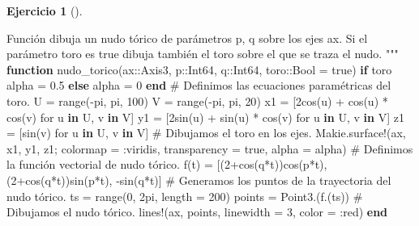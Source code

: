 \documentclass[
  a4paper,
]{scrreport}
\newenvironment{Shaded}{\begin{snugshade}}{\end{snugshade}}
\newcommand{\CommentTok}[1]{\textcolor[rgb]{0.37,0.37,0.37}{#1}}
\newcommand{\ConstantTok}[1]{\textcolor[rgb]{0.56,0.35,0.01}{#1}}
\newcommand{\ControlFlowTok}[1]{\textcolor[rgb]{0.00,0.23,0.31}{\textbf{#1}}}
\newcommand{\DataTypeTok}[1]{\textcolor[rgb]{0.68,0.00,0.00}{#1}}
\newcommand{\FloatTok}[1]{\textcolor[rgb]{0.68,0.00,0.00}{#1}}
\newcommand{\FunctionTok}[1]{\textcolor[rgb]{0.28,0.35,0.67}{#1}}
\newcommand{\KeywordTok}[1]{\textcolor[rgb]{0.00,0.23,0.31}{\textbf{#1}}}
\newcommand{\NormalTok}[1]{\textcolor[rgb]{0.00,0.23,0.31}{#1}}
\newcommand{\OperatorTok}[1]{\textcolor[rgb]{0.37,0.37,0.37}{#1}}
\newcommand{\StringTok}[1]{\textcolor[rgb]{0.13,0.47,0.30}{#1}}
\theoremstyle{definition}
\newtheorem{exercise}{Ejercicio}[chapter]
\theoremstyle{remark}
\begin{document}
\begin{exercise}[]
\begin{enumerate}
\begin{tcolorbox}
\begin{Shaded}
\begin{Highlighting}[]
\StringTok{Función dibuja un nudo tórico de parámetros p, q sobre los ejes ax. Si el parámetro toro es true dibuja también el toro sobre el que se traza el nudo.}
\StringTok{"""}
\KeywordTok{function} \FunctionTok{nudo\_torico}\NormalTok{(ax}\OperatorTok{::}\DataTypeTok{Axis3}\NormalTok{, p}\OperatorTok{::}\DataTypeTok{Int64}\NormalTok{, q}\OperatorTok{::}\DataTypeTok{Int64}\NormalTok{, toro}\OperatorTok{::}\DataTypeTok{Bool }\OperatorTok{=} \ConstantTok{true}\NormalTok{)}
    \ControlFlowTok{if}\NormalTok{ toro }
\NormalTok{        alpha }\OperatorTok{=} \FloatTok{0.5}
    \ControlFlowTok{else}
\NormalTok{        alpha }\OperatorTok{=} \FloatTok{0}
    \ControlFlowTok{end}
    \CommentTok{\# Definimos las ecuaciones paramétricas del toro.}
\NormalTok{    U }\OperatorTok{=} \FunctionTok{range}\NormalTok{(}\OperatorTok{{-}}\ConstantTok{pi}\NormalTok{, }\ConstantTok{pi}\NormalTok{, }\FloatTok{100}\NormalTok{)}
\NormalTok{    V }\OperatorTok{=} \FunctionTok{range}\NormalTok{(}\OperatorTok{{-}}\ConstantTok{pi}\NormalTok{, }\ConstantTok{pi}\NormalTok{, }\FloatTok{20}\NormalTok{)}
\NormalTok{    x1 }\OperatorTok{=}\NormalTok{ [}\FloatTok{2}\FunctionTok{cos}\NormalTok{(u) }\OperatorTok{+} \FunctionTok{cos}\NormalTok{(u) }\OperatorTok{*} \FunctionTok{cos}\NormalTok{(v) for u }\KeywordTok{in}\NormalTok{ U, v }\KeywordTok{in}\NormalTok{ V]}
\NormalTok{    y1 }\OperatorTok{=}\NormalTok{ [}\FloatTok{2}\FunctionTok{sin}\NormalTok{(u) }\OperatorTok{+} \FunctionTok{sin}\NormalTok{(u) }\OperatorTok{*} \FunctionTok{cos}\NormalTok{(v) for u }\KeywordTok{in}\NormalTok{ U, v }\KeywordTok{in}\NormalTok{ V]}
\NormalTok{    z1 }\OperatorTok{=}\NormalTok{ [}\FunctionTok{sin}\NormalTok{(v) for u }\KeywordTok{in}\NormalTok{ U, v }\KeywordTok{in}\NormalTok{ V]}
    \CommentTok{\# Dibujamos el toro en los ejes.}
\NormalTok{    Makie.}\FunctionTok{surface!}\NormalTok{(ax, x1, y1, z1; colormap }\OperatorTok{=} \OperatorTok{:}\NormalTok{viridis, transparency }\OperatorTok{=} \ConstantTok{true}\NormalTok{, alpha }\OperatorTok{=}\NormalTok{ alpha)}
    \CommentTok{\# Definimos la función vectorial de nudo tórico.}
    \FunctionTok{f}\NormalTok{(t) }\OperatorTok{=}\NormalTok{ [(}\FloatTok{2}\FunctionTok{+cos}\NormalTok{(q}\OperatorTok{*}\NormalTok{t))}\FunctionTok{cos}\NormalTok{(p}\OperatorTok{*}\NormalTok{t), (}\FloatTok{2}\FunctionTok{+cos}\NormalTok{(q}\OperatorTok{*}\NormalTok{t))}\FunctionTok{sin}\NormalTok{(p}\OperatorTok{*}\NormalTok{t), }\FunctionTok{{-}sin}\NormalTok{(q}\OperatorTok{*}\NormalTok{t)] }
    \CommentTok{\# Generamos los puntos de la trayectoria del nudo tórico.}
\NormalTok{    ts }\OperatorTok{=} \FunctionTok{range}\NormalTok{(}\FloatTok{0}\NormalTok{, }\FloatTok{2}\NormalTok{pi, length }\OperatorTok{=} \FloatTok{200}\NormalTok{)}
\NormalTok{    points }\OperatorTok{=} \FunctionTok{Point3}\NormalTok{.(}\FunctionTok{f}\NormalTok{.(ts))}
    \CommentTok{\# Dibujamos el nudo tórico.}
    \FunctionTok{lines!}\NormalTok{(ax, points, linewidth }\OperatorTok{=} \FloatTok{3}\NormalTok{, color }\OperatorTok{=} \OperatorTok{:}\NormalTok{red)}
\KeywordTok{end}


\end{Highlighting}
\end{Shaded}
\end{tcolorbox}
\end{enumerate}
\end{exercise}
\end{document}
